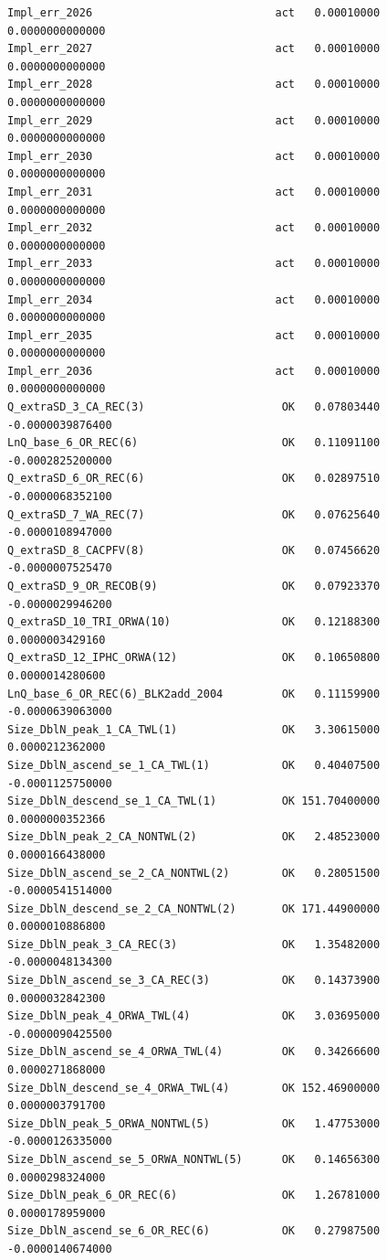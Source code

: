 \documentclass[
]{scrartcl}
\begin{document}
\begin{verbatim}
Impl_err_2026                            act   0.00010000  0.0000000000000
Impl_err_2027                            act   0.00010000  0.0000000000000
Impl_err_2028                            act   0.00010000  0.0000000000000
Impl_err_2029                            act   0.00010000  0.0000000000000
Impl_err_2030                            act   0.00010000  0.0000000000000
Impl_err_2031                            act   0.00010000  0.0000000000000
Impl_err_2032                            act   0.00010000  0.0000000000000
Impl_err_2033                            act   0.00010000  0.0000000000000
Impl_err_2034                            act   0.00010000  0.0000000000000
Impl_err_2035                            act   0.00010000  0.0000000000000
Impl_err_2036                            act   0.00010000  0.0000000000000
Q_extraSD_3_CA_REC(3)                     OK   0.07803440 -0.0000039876400
LnQ_base_6_OR_REC(6)                      OK   0.11091100 -0.0002825200000
Q_extraSD_6_OR_REC(6)                     OK   0.02897510 -0.0000068352100
Q_extraSD_7_WA_REC(7)                     OK   0.07625640 -0.0000108947000
Q_extraSD_8_CACPFV(8)                     OK   0.07456620 -0.0000007525470
Q_extraSD_9_OR_RECOB(9)                   OK   0.07923370 -0.0000029946200
Q_extraSD_10_TRI_ORWA(10)                 OK   0.12188300  0.0000003429160
Q_extraSD_12_IPHC_ORWA(12)                OK   0.10650800  0.0000014280600
LnQ_base_6_OR_REC(6)_BLK2add_2004         OK   0.11159900 -0.0000639063000
Size_DblN_peak_1_CA_TWL(1)                OK   3.30615000  0.0000212362000
Size_DblN_ascend_se_1_CA_TWL(1)           OK   0.40407500 -0.0001125750000
Size_DblN_descend_se_1_CA_TWL(1)          OK 151.70400000  0.0000000352366
Size_DblN_peak_2_CA_NONTWL(2)             OK   2.48523000  0.0000166438000
Size_DblN_ascend_se_2_CA_NONTWL(2)        OK   0.28051500 -0.0000541514000
Size_DblN_descend_se_2_CA_NONTWL(2)       OK 171.44900000  0.0000010886800
Size_DblN_peak_3_CA_REC(3)                OK   1.35482000 -0.0000048134300
Size_DblN_ascend_se_3_CA_REC(3)           OK   0.14373900  0.0000032842300
Size_DblN_peak_4_ORWA_TWL(4)              OK   3.03695000 -0.0000090425500
Size_DblN_ascend_se_4_ORWA_TWL(4)         OK   0.34266600  0.0000271868000
Size_DblN_descend_se_4_ORWA_TWL(4)        OK 152.46900000  0.0000003791700
Size_DblN_peak_5_ORWA_NONTWL(5)           OK   1.47753000 -0.0000126335000
Size_DblN_ascend_se_5_ORWA_NONTWL(5)      OK   0.14656300  0.0000298324000
Size_DblN_peak_6_OR_REC(6)                OK   1.26781000  0.0000178959000
Size_DblN_ascend_se_6_OR_REC(6)           OK   0.27987500 -0.0000140674000

\end{verbatim}
\end{document}
